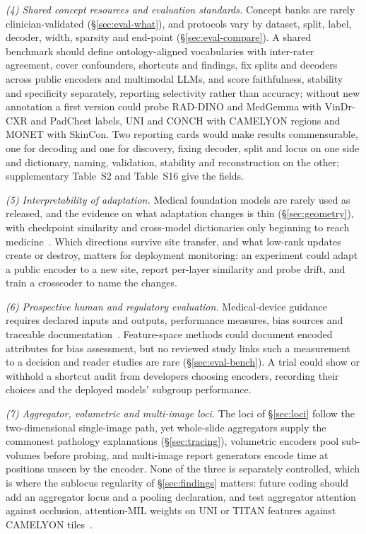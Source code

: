\textit{(4) Shared concept resources and evaluation standards.} Concept banks are rarely clinician-validated
(\S\ref{sec:eval-what}), and protocols vary by dataset, split, label, decoder, width, sparsity and end-point
(\S\ref{sec:eval-compare}). A shared benchmark should define ontology-aligned vocabularies with inter-rater agreement, cover
confounders, shortcuts and findings, fix splits and decoders across public encoders and multimodal LLMs, and
score faithfulness, stability and specificity separately, reporting selectivity rather than accuracy; without
new annotation a first version could probe RAD-DINO and MedGemma with VinDr-CXR and PadChest labels, UNI and
CONCH with CAMELYON regions and MONET with SkinCon. Two reporting cards would make results commensurable, one for
decoding and one for discovery, fixing decoder, split and locus on one side and dictionary, naming,
validation, stability and reconstruction on the other; supplementary Table~S2 and
Table~S16 give the fields.

\textit{(5) Interpretability of adaptation.} Medical foundation models are rarely used as released, and the
evidence on what adaptation changes is thin (\S\ref{sec:geometry}), with checkpoint similarity and cross-model
dictionaries only beginning to reach
medicine~\cite{minder2025overcoming,ahmed2026medseglens}. Which directions survive site transfer, and what
low-rank updates create or destroy, matters for deployment monitoring: an experiment could adapt a public
encoder to a new site, report per-layer similarity and probe drift, and train a crosscoder to name the changes.

\textit{(6) Prospective human and regulatory evaluation.} Medical-device guidance requires declared inputs and
outputs, performance measures, bias sources and traceable
documentation~\cite{fda2025aiguidance,euaiact2024}. Feature-space methods could document encoded attributes
for bias assessment, but no reviewed study links such a measurement to a decision and reader studies are rare
(\S\ref{sec:eval-bench}). A trial could show or withhold a shortcut audit from developers choosing
encoders, recording their choices and the deployed models' subgroup performance.

\textit{(7) Aggregator, volumetric and multi-image loci.} The loci of \S\ref{sec:loci} follow the
two-dimensional single-image path, yet whole-slide aggregators supply the commonest pathology explanations
(\S\ref{sec:tracing}), volumetric encoders pool sub-volumes before probing, and multi-image report generators
encode time at positions unseen by the encoder. None of the three is separately controlled, which is where the sublocus regularity of \S\ref{sec:findings} matters: future coding should add an aggregator locus and a pooling
declaration, and test aggregator attention against occlusion, attention-MIL weights on UNI or TITAN features
against CAMELYON tiles~\cite{sadanandan2026attention}.

